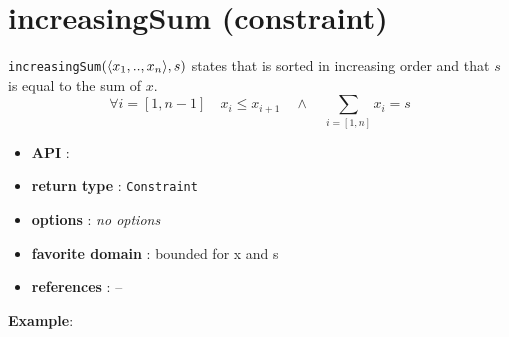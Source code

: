 \label{increasingsum}
\hypertarget{increasingsum}{}

\section{increasingSum (constraint)}\label{increasingsum:increasingsumconstraint}\hypertarget{increasingsum:increasingsumconstraint}{}
\begin{notedef}
  \texttt{increasingSum}$(\langle x_1,..,x_n\rangle,s)$ states that  is sorted in increasing order and that $s$ is equal to the sum of $x$.
$$\forall i=[1,n-1] \quad x_i \le x_{i+1}\quad\wedge \quad \sum_{i =[1,n]}x_i = s $$
\end{notedef}
\begin{itemize}
	\item \textbf{API} : 
	\item \textbf{return type} : \texttt{Constraint}
	\item \textbf{options} : \emph{no options}
	\item \textbf{favorite domain} : bounded for x and s
	\item \textbf{references} : --
\end{itemize}

\textbf{Example}:

